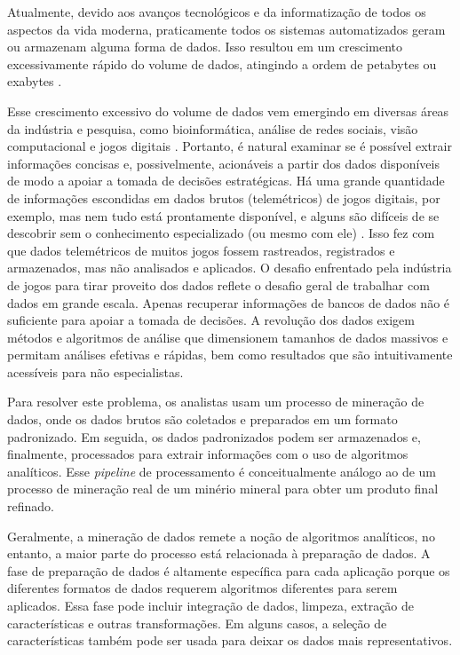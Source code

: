 Atualmente, devido aos avanços tecnológicos e da informatização de todos os aspectos da vida moderna, praticamente todos os sistemas automatizados geram ou armazenam alguma forma de dados. Isso resultou em um crescimento excessivamente rápido do volume de dados, atingindo a ordem de petabytes ou exabytes \cite{aggarwal2015data}.

Esse crescimento excessivo do volume de dados vem emergindo em diversas áreas da indústria e pesquisa, como bioinformática, análise de redes sociais, visão computacional e jogos digitais \cite{el2016game}. Portanto, é natural examinar se é possível extrair informações concisas e, possivelmente, acionáveis a partir dos dados disponíveis de modo a apoiar a tomada de decisões estratégicas. Há uma grande quantidade de informações escondidas em dados brutos (telemétricos) de jogos digitais, por exemplo, mas nem tudo está prontamente disponível, e alguns são difíceis de se descobrir sem o conhecimento especializado (ou mesmo com ele) \cite{el2016game}. Isso fez com que dados telemétricos de muitos jogos fossem rastreados, registrados e armazenados, mas não analisados e aplicados. O desafio enfrentado pela indústria de jogos para tirar proveito dos dados reflete o desafio geral de trabalhar com dados em grande escala. Apenas recuperar informações de bancos de dados não é suficiente para apoiar a tomada de decisões. A revolução dos dados exigem métodos e algoritmos de análise que dimensionem tamanhos de dados massivos e permitam análises efetivas e rápidas, bem como resultados que são intuitivamente acessíveis para não especialistas.

Para resolver este problema, os analistas usam um processo de mineração de dados, onde os dados brutos são coletados e preparados em um formato padronizado. Em seguida, os dados padronizados podem ser armazenados e, finalmente, processados para extrair informações com o uso de algoritmos analíticos. Esse \textit{pipeline} de processamento é conceitualmente análogo ao de um processo de mineração real de um minério mineral para obter um produto final refinado.

Geralmente, a mineração de dados remete a noção de algoritmos analíticos, no entanto, a maior parte do processo está relacionada à preparação de dados. A fase de preparação de dados é altamente específica para cada aplicação porque os diferentes formatos de dados requerem algoritmos diferentes para serem aplicados. Essa fase pode incluir integração de dados, limpeza, extração de características e outras transformações. Em alguns casos, a seleção de características também pode ser usada para deixar os dados mais representativos.

